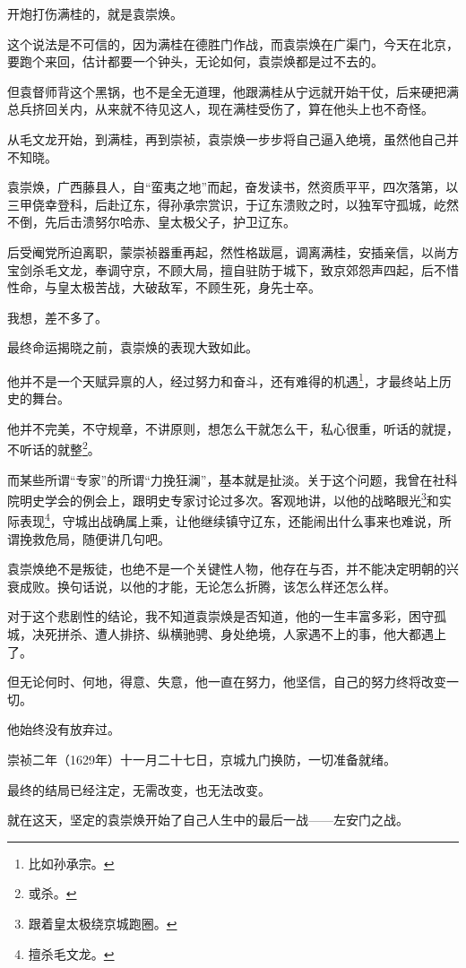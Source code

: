 \begin{multicols}{\theparacolNo}
		开炮打伤满桂的，就是袁崇焕。

		这个说法是不可信的，因为满桂在德胜门作战，而袁崇焕在广渠门，今天在北京，要跑个来回，估计都要一个钟头，无论如何，袁崇焕都是过不去的。

		但袁督师背这个黑锅，也不是全无道理，他跟满桂从宁远就开始干仗，后来硬把满总兵挤回关内，从来就不待见这人，现在满桂受伤了，算在他头上也不奇怪。

		从毛文龙开始，到满桂，再到崇祯，袁崇焕一步步将自己逼入绝境，虽然他自己并不知晓。

		袁崇焕，广西藤县人，自“蛮夷之地”而起，奋发读书，然资质平平，四次落第，以三甲侥幸登科，后赴辽东，得孙承宗赏识，于辽东溃败之时，以独军守孤城，屹然不倒，先后击溃努尔哈赤、皇太极父子，护卫辽东。

		后受阉党所迫离职，蒙崇祯器重再起，然性格跋扈，调离满桂，安插亲信，以尚方宝剑杀毛文龙，奉调守京，不顾大局，擅自驻防于城下，致京郊怨声四起，后不惜性命，与皇太极苦战，大破敌军，不顾生死，身先士卒。

		我想，差不多了。

		最终命运揭晓之前，袁崇焕的表现大致如此。

		他并不是一个天赋异禀的人，经过努力和奋斗，还有难得的机遇\footnote{比如孙承宗。}，才最终站上历史的舞台。

		他并不完美，不守规章，不讲原则，想怎么干就怎么干，私心很重，听话的就提，不听话的就整\footnote{或杀。}。

		而某些所谓“专家”的所谓“力挽狂澜”，基本就是扯淡。关于这个问题，我曾在社科院明史学会的例会上，跟明史专家讨论过多次。客观地讲，以他的战略眼光\footnote{跟着皇太极绕京城跑圈。}和实际表现\footnote{擅杀毛文龙。}，守城出战确属上乘，让他继续镇守辽东，还能闹出什么事来也难说，所谓挽救危局，随便讲几句吧。

		袁崇焕绝不是叛徒，也绝不是一个关键性人物，他存在与否，并不能决定明朝的兴衰成败。换句话说，以他的才能，无论怎么折腾，该怎么样还怎么样。

		对于这个悲剧性的结论，我不知道袁崇焕是否知道，他的一生丰富多彩，困守孤城，决死拼杀、遭人排挤、纵横驰骋、身处绝境，人家遇不上的事，他大都遇上了。

		但无论何时、何地，得意、失意，他一直在努力，他坚信，自己的努力终将改变一切。

		他始终没有放弃过。

		崇祯二年（1629年）十一月二十七日，京城九门换防，一切准备就绪。

		最终的结局已经注定，无需改变，也无法改变。

		就在这天，坚定的袁崇焕开始了自己人生中的最后一战——左安门之战。


\end{multicols}
